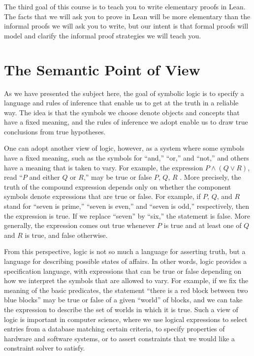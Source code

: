 \documentclass[letterpaper,10pt,english]{sphinxmanual}
\begin{document}
\begin{sphinxVerbatim}[commandchars=\\\{\}]
\end{sphinxVerbatim}

\sphinxAtStartPar
The third goal of this course is to teach you to write elementary proofs in Lean. The facts that we will ask you to prove in Lean will be more elementary than the informal proofs we will ask you to write, but our intent is that formal proofs will model and clarify the informal proof strategies we will teach you.


\section{The Semantic Point of View}
\label{\detokenize{introduction:the-semantic-point-of-view}}
\sphinxAtStartPar
As we have presented the subject here, the goal of symbolic logic is to specify a language and rules of inference that enable us to get at the truth in a reliable way. The idea is that the symbols we choose denote objects and concepts that have a fixed meaning, and the rules of inference we adopt enable us to draw true conclusions from true hypotheses.

\sphinxAtStartPar
One can adopt another view of logic, however, as a system where some symbols have a fixed meaning, such as the symbols for “and,” “or,” and “not,” and others have a meaning that is taken to vary. For example, the expression \(P \wedge (Q \vee R)\), read “\(P\) and either \(Q\) or \(R\),” may be true or false  \(P\), \(Q\),  \(R\) . More precisely, the truth of the compound expression depends only on whether the component symbols denote expressions that are true or false. For example, if \(P\), \(Q\), and \(R\) stand for “seven is prime,” “seven is even,” and “seven is odd,” respectively, then the expression is true. If we replace “seven” by “six,” the statement is false. More generally, the expression comes out true whenever \(P\) is true and at least one of \(Q\) and \(R\) is true, and false otherwise.

\sphinxAtStartPar
From this perspective, logic is not so much a language for asserting truth, but a language for describing possible states of affairs. In other words, logic provides a specification language, with expressions that can be true or false depending on how we interpret the symbols that are allowed to vary. For example, if we fix the meaning of the basic predicates, the statement “there is a red block between two blue blocks” may be true or false of a given “world” of blocks, and we can take the expression to describe the set of worlds in which it is true. Such a view of logic is important in computer science, where we use logical expressions to select entries from a database matching certain criteria, to specify properties of hardware and software systems, or to assert constraints that we would like a constraint solver to satisfy.
\end{document}

